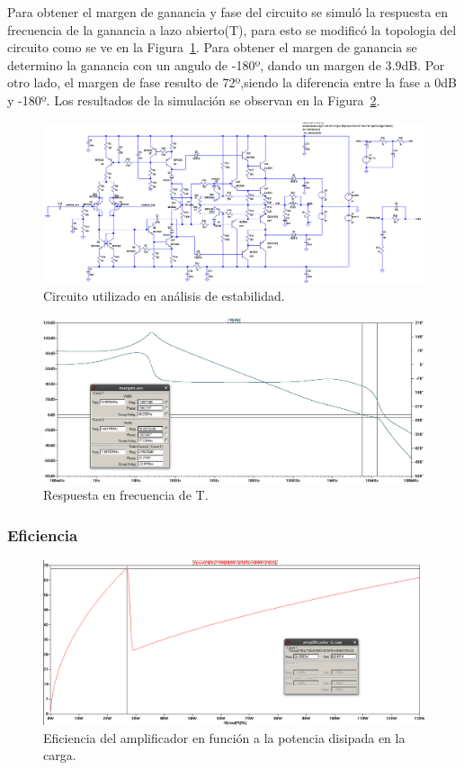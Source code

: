 Para obtener el margen de ganancia y fase del circuito se simuló la respuesta en frecuencia de la ganancia a lazo abierto(T), para esto se modificó la topologia del circuito como se ve en la Figura~\ref{cir_simul_estab}. Para obtener el margen de ganancia se determino la ganancia con un angulo de -180º, dando un margen de 3.9dB. Por otro lado, el margen de fase resulto de 72º,siendo la diferencia entre la fase a 0dB y -180º.
Los resultados de la simulación se observan en la Figura~\ref{simul_estab}.

\begin{figure}[H]
\centering
\includegraphics[width=1\textwidth]{img/margen_fase_ganancia_cir.png}
\caption{Circuito utilizado en análisis de estabilidad.}
\label{cir_simul_estab}
\end{figure}


\begin{figure}[H]
\centering
\includegraphics[width=1\textwidth]{img/margen_fase_ganancia.png}
\caption{Respuesta en frecuencia de T.}
\label{simul_estab}
\end{figure}

\medskip
\subsubsection{Eficiencia}



\begin{figure}[H]
\centering
\includegraphics[width=1\textwidth]{img/eficiencia.png}
\caption{Eficiencia del amplificador en función a la potencia disipada en la carga.}
\label{simul_efi}
\end{figure}
